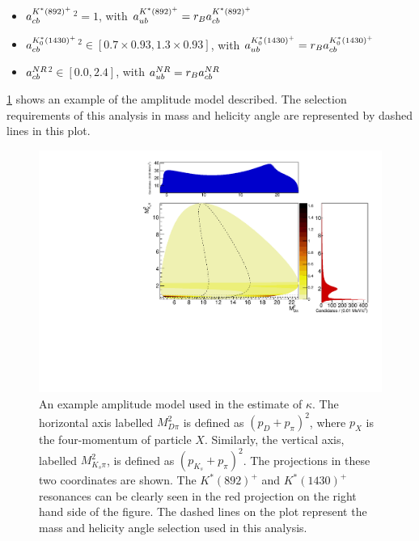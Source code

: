 \begin{itemize}
\item \textbar $a_{{c}{b}}^{K^*(892)^+}$\textbar$^2 = 1$, \hspace{12pt} with $a_{{u}{b}}^{K^*(892)^+} = r_B a_{{c}{b}}^{K^*(892)^+}$
\item \textbar $a_{{c}{b}}^{K^*_0(1430)^+}$\textbar$^2 \in [0.7 \times 0.93,1.3 \times 0.93]$, \hspace{14pt} with $a_{{u}{b}}^{K^*_0(1430)^+} = r_B a_{{c}{b}}^{K^*_0(1430)^+}$
\item \textbar $a_{{c}{b}}^{NR}$\textbar$^2 \in [0.0,2.4]$, \hspace{12pt} with $a_{{u}{b}}^{NR} = r_B a_{{c}{b}}^{NR}$ 
\end{itemize}

\Fig\ref{dalitzplot} shows an example of the amplitude model described. The \Kstar selection requirements of this analysis in \Kstar mass and \KS helicity angle are represented by dashed lines in this plot.

\begin{figure}[h]
\centering
\includegraphics[width=\linewidth]{figures/results/dalitz.pdf}
\caption{An example amplitude model used in the estimate of $\kappa$. The horizontal axis labelled $M_{D\pi}^2$ is defined as $(p_D + p_{\pi})^2$, where $p_{X}$ is the four-momentum of particle $X$. Similarly, the vertical axis, labelled $M_{K_s\pi}^2$, is defined as $(p_{K_s} + p_{\pi})^2$. The projections in these two coordinates are shown. The $K^*(892)^+$ and $K^*(1430)^+$ resonances can be clearly seen in the red projection on the right hand side of the figure. The dashed lines on the plot represent the \Kstar mass and \KS helicity angle selection used in this analysis.}
\label{dalitzplot}
\end{figure}


